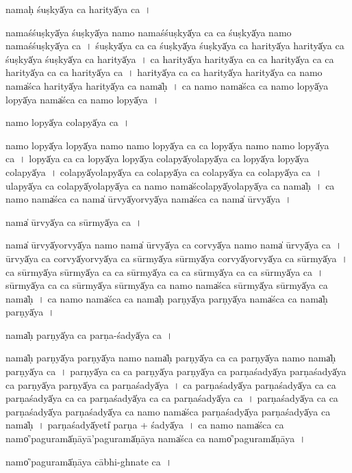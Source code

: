 \documentclass[parskip, DIV=14]{scrartcl}
\begin{document}
{nama॒ḥ śuṣkyā̍ya ca hari॒tyā̍ya ca॒~।

nama॒śśuṣkyā̍ya॒ śuṣkyā̍ya॒ namo॒ nama॒śśuṣkyā̍ya ca ca॒ śuṣkyā̍ya॒ namo॒ nama॒śśuṣkyā̍ya ca~।
śuṣkyā̍ya ca ca॒ śuṣkyā̍ya॒ śuṣkyā̍ya ca hari॒tyā̍ya hari॒tyā̍ya ca॒ śuṣkyā̍ya॒ śuṣkyā̍ya ca hari॒tyā̍ya~।
ca॒ ha॒ri॒tyā̍ya hari॒tyā̍ya ca ca hari॒tyā̍ya ca ca hari॒tyā̍ya ca ca hari॒tyā̍ya ca~।
ha॒ri॒tyā̍ya ca ca hari॒tyā̍ya hari॒tyā̍ya ca॒ namo॒ nama̍śca hari॒tyā̍ya hari॒tyā̍ya ca॒ nama̍ḥ~।
ca॒ namo॒ nama̍śca ca॒ namo॒ lopyā̍ya॒ lopyā̍ya॒ nama̍śca ca॒ namo॒ lopyā̍ya~।

namo॒ lopyā̍ya cola॒pyā̍ya ca॒~।

namo॒ lopyā̍ya॒ lopyā̍ya॒ namo॒ namo॒ lopyā̍ya ca ca॒ lopyā̍ya॒ namo॒ namo॒ lopyā̍ya ca~।
lopyā̍ya ca ca॒ lopyā̍ya॒ lopyā̍ya cola॒pyā̍yola॒pyā̍ya ca॒ lopyā̍ya॒ lopyā̍ya cola॒pyā̍ya~।
co॒la॒pyā̍yola॒pyā̍ya ca cola॒pyā̍ya ca cola॒pyā̍ya ca cola॒pyā̍ya ca~।
u॒la॒pyā̍ya ca cola॒pyā̍yola॒pyā̍ya ca॒ namo॒ nama̍ścola॒pyā̍yola॒pyā̍ya ca॒ nama̍ḥ~।
ca॒ namo॒ nama̍śca ca॒ nama̍ ū॒rvyā̍yo॒rvyā̍ya॒ nama̍śca ca॒ nama̍ ū॒rvyā̍ya~।

nama̍ ū॒rvyā̍ya ca sū॒rmyā̍ya ca~।

nama̍ ū॒rvyā̍yo॒rvyā̍ya॒ namo॒ nama̍ ū॒rvyā̍ya ca co॒rvyā̍ya॒ namo॒ nama̍ ū॒rvyā̍ya ca~।
ū॒rvyā̍ya ca co॒rvyā̍yo॒rvyā̍ya ca sū॒rmyā̍ya sū॒rmyā̍ya co॒rvyā̍yo॒rvyā̍ya ca sū॒rmyā̍ya~।
ca॒ sū॒rmyā̍ya sū॒rmyā̍ya ca ca sū॒rmyā̍ya ca ca sū॒rmyā̍ya ca ca sū॒rmyā̍ya ca~।
sū॒rmyā̍ya ca ca sū॒rmyā̍ya sū॒rmyā̍ya ca॒ namo॒ nama̍śca sū॒rmyā̍ya sū॒rmyā̍ya ca॒ nama̍ḥ~।
ca॒ namo॒ nama̍śca ca॒ nama̍ḥ pa॒rṇyā̍ya pa॒rṇyā̍ya॒ nama̍śca ca॒ nama̍ḥ pa॒rṇyā̍ya~।

nama̍ḥ pa॒rṇyā̍ya ca parṇa-śa॒dyā̍ya ca॒~।

nama̍ḥ pa॒rṇyā̍ya pa॒rṇyā̍ya॒ namo॒ nama̍ḥ pa॒rṇyā̍ya ca ca pa॒rṇyā̍ya॒ namo॒ nama̍ḥ pa॒rṇyā̍ya ca~।
pa॒rṇyā̍ya ca ca pa॒rṇyā̍ya pa॒rṇyā̍ya ca parṇaśa॒dyā̍ya parṇaśa॒dyā̍ya ca pa॒rṇyā̍ya pa॒rṇyā̍ya ca parṇaśa॒dyā̍ya~।
ca॒ pa॒rṇa॒śa॒dyā̍ya parṇaśa॒dyā̍ya ca ca parṇaśa॒dyā̍ya ca ca parṇaśa॒dyā̍ya ca ca parṇaśa॒dyā̍ya ca~।
pa॒rṇa॒śa॒dyā̍ya ca ca parṇaśa॒dyā̍ya parṇaśa॒dyā̍ya ca॒ namo॒ nama̍śca parṇaśa॒dyā̍ya parṇaśa॒dyā̍ya ca॒ nama̍ḥ~।
pa॒rṇa॒śa॒dyā̍yeti̍ parṇa + śa॒dyā̍ya~।
ca॒ namo॒ nama̍śca ca॒ namo̍'pagu॒ramā̍ṇāyā'pagu॒ramā̍ṇāya॒ nama̍śca ca॒ namo̍'pagu॒ramā̍ṇāya~।

namo̍'pagu॒ramā̍ṇāya cābhi-ghna॒te ca॒~।

}
\end{document}
